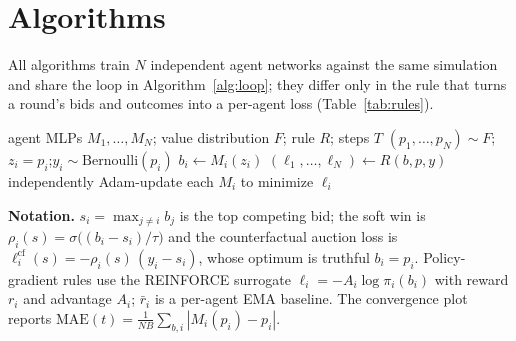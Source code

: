 %
%

\section{Algorithms}
\label{sec:algorithms}

All algorithms train $N$ independent agent networks against the same simulation
and share the loop in Algorithm~\ref{alg:loop}; they differ only in the rule that
turns a round's bids and outcomes into a per-agent loss (Table~\ref{tab:rules}).

\begin{algorithm}[t]
\caption{Shared training loop ($N$ independent agents, rule $R$)}
\label{alg:loop}
\begin{algorithmic}[1]
\Require agent MLPs $M_1,\dots,M_N$; value distribution $F$; rule $R$; steps $T$
  \State $(p_1,\dots,p_N)\sim F$;\quad $z_i \!=\! p_i$;\quad $y_i \sim \mathrm{Bernoulli}(p_i)$
  \State $b_i \gets M_i(z_i)$ 
  \State $(\ell_1,\dots,\ell_N) \gets R(b,p,y)$ 
  \State independently Adam-update each $M_i$ to minimize $\ell_i$
\EndFor
\end{algorithmic}
\end{algorithm}

\noindent\textbf{Notation.} $s_i=\max_{j\ne i} b_j$ is the top competing bid; the
soft win is $\rho_i(s)=\sigma\!\big((b_i-s_i)/\tau\big)$ and the counterfactual
auction loss is $\ell^{\mathrm{cf}}_i(s)=-\rho_i(s)\,(y_i-s_i)$, whose optimum is
truthful $b_i=p_i$. Policy-gradient rules use the REINFORCE surrogate
$\ell_i=-A_i\log\pi_i(b_i)$ with reward $r_i$ and advantage $A_i$; $\bar r_i$ is a
per-agent EMA baseline. The convergence plot reports
$\mathrm{MAE}(t)=\frac{1}{NB}\sum_{b,i}|M_i(p_i)-p_i|$.


